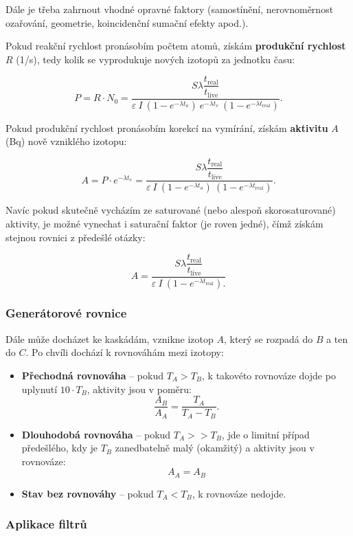 Dále je třeba zahrnout vhodné opravné faktory (samostínění, nerovnoměrnost ozařování, geometrie, koincidenční sumační efekty apod.).

Pokud reakční rychlost pronásobím počtem atomů, získám \textbf{produkční rychlost} $R$ (1/s), tedy kolik se vyprodukuje nových izotopů za jednotku času:

$$ \boxed{ P = R \cdot N_0 = \dfrac{S \lambda \dfrac{t_\text{real}}{t_\text{live}}}{\varepsilon \: I \: (1-e^{-\lambda t_a}) \: e^{-\lambda t_v} \: (1-e^{-\lambda t_\text{real}})}.} $$

Pokud produkční rychlost pronásobím korekcí na vymírání, získám \textbf{aktivitu} $A$ (Bq) nově vzniklého izotopu:

$$ \boxed{ A = P \cdot e^{-\lambda t_v} = \dfrac{S \lambda \dfrac{t_\text{real}}{t_\text{live}}}{\varepsilon \: I \: (1-e^{-\lambda t_a}) \: (1-e^{-\lambda t_\text{real}})}.} $$

Navíc pokud skutečně vycházím ze saturované (nebo alespoň skorosaturované) aktivity, je možné vynechat i saturační faktor (je roven jedné), čímž získám stejnou rovnici z předešlé otázky:

$$ A = \dfrac{S \lambda \dfrac{t_\text{real}}{t_\text{live}}}{\varepsilon \: I \: (1-e^{-\lambda t_\text{real}}).} $$

\subsubsection{Generátorové rovnice}

Dále může docházet ke kaskádám, vznikne izotop $A$, který se rozpadá do $B$ a ten do $C$. Po chvíli dochází k rovnováhám mezi izotopy:

\begin{itemize}
    \item \textbf{Přechodná rovnováha} -- pokud $T_A > T_B$, k takovéto rovnováze dojde po uplynutí $10 \cdot T_B$, aktivity jsou v poměru:
    $$ \dfrac{A_B}{A_A} = \dfrac{T_A}{T_A - T_B}. $$
    \item \textbf{Dlouhodobá rovnováha} -- pokud $T_A >> T_B$, jde o limitní případ předešlého, kdy je $T_B$ zanedbatelně malý (okamžitý) a aktivity jsou v rovnováze:
    $$ A_A = A_B $$
    \item \textbf{Stav bez rovnováhy} -- pokud $T_A < T_B $, k rovnováze nedojde.
\end{itemize}

\subsubsection{Aplikace filtrů}


